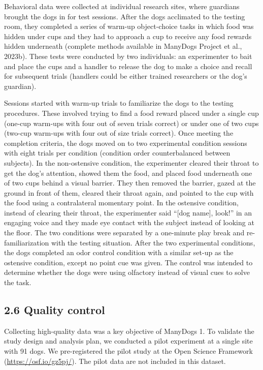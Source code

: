 \documentclass[
  pub,floatsintext]{apa6}
\begin{document}
Behavioral data were collected at individual research sites, where guardians brought the dogs in for test sessions. After the dogs acclimated to the testing room, they completed a series of warm-up object-choice tasks in which food was hidden under cups and they had to approach a cup to receive any food rewards hidden underneath (complete methods available in ManyDogs Project et al., 2023b). These tests were conducted by two individuals: an experimenter to bait and place the cups and a handler to release the dog to make a choice and recall for subsequent trials (handlers could be either trained researchers or the dog's guardian).

Sessions started with warm-up trials to familiarize the dogs to the testing procedures. These involved trying to find a food reward placed under a single cup (one-cup warm-ups with four out of seven trials correct) or under one of two cups (two-cup warm-ups with four out of size trials correct). Once meeting the completion criteria, the dogs moved on to two experimental condition sessions with eight trials per condition (condition order counterbalanced between subjects). In the non-ostensive condition, the experimenter cleared their throat to get the dog's attention, showed them the food, and placed food underneath one of two cups behind a visual barrier. They then removed the barrier, gazed at the ground in front of them, cleared their throat again, and pointed to the cup with the food using a contralateral momentary point. In the ostensive condition, instead of clearing their throat, the experimenter said ``{[}dog name{]}, look!'' in an engaging voice and they made eye contact with the subject instead of looking at the floor. The two conditions were separated by a one-minute play break and re-familiarization with the testing situation. After the two experimental conditions, the dogs completed an odor control condition with a similar set-up as the ostensive condition, except no point cue was given. The control was intended to determine whether the dogs were using olfactory instead of visual cues to solve the task.

\hypertarget{quality-control}{%
\subsection{2.6 Quality control}\label{quality-control}}

Collecting high-quality data was a key objective of ManyDogs 1. To validate the study design and analysis plan, we conducted a pilot experiment at a single site with 91 dogs. We pre-registered the pilot study at the Open Science Framework (\url{https://osf.io/gz5pj/}). The pilot data are not included in this dataset.
\end{document}
